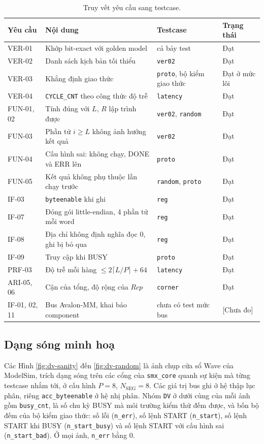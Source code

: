 \begin{table}[htbp]
\centering
\small
\begin{tabular}{lp{6.5cm}p{3.4cm}l}
\toprule
Yêu cầu & Nội dung & Testcase & Trạng thái \\
\midrule
VER-01 & Khớp bit-exact với golden model & cả bảy test & Đạt \\
VER-02 & Danh sách kịch bản tối thiểu & \texttt{ver02} & Đạt \\
VER-03 & Khẳng định giao thức & \texttt{proto}, bộ kiểm giao thức & Đạt ở mức lõi \\
VER-04 & \texttt{CYCLE\_CNT} theo công thức độ trễ & \texttt{latency} & Đạt \\
FUN-01, 02 & Tính đúng với $L$, $R$ lập trình được & \texttt{ver02}, \texttt{random} & Đạt \\
FUN-03 & Phần tử $i \ge L$ không ảnh hưởng kết quả & \texttt{ver02} & Đạt \\
FUN-04 & Cấu hình sai: không chạy, DONE và ERR lên & \texttt{proto} & Đạt \\
FUN-05 & Kết quả không phụ thuộc lần chạy trước & \texttt{random}, \texttt{proto} & Đạt \\
IF-03 & \texttt{byteenable} khi ghi & \texttt{reg} & Đạt \\
IF-07 & Đóng gói little-endian, 4 phần tử mỗi word & \texttt{reg} & Đạt \\
IF-08 & Địa chỉ không định nghĩa đọc 0, ghi bị bỏ qua & \texttt{reg} & Đạt \\
IF-09 & Truy cập khi BUSY & \texttt{proto} & Đạt \\
PRF-03 & Độ trễ mỗi hàng $\le 2\lceil L/P \rceil + 64$ & \texttt{latency} & Đạt \\
ARI-05, 06 & Cận của tổng, độ rộng của $\mathit{Rcp}$ & \texttt{corner} & Đạt \\
IF-01, 02, 11 & Bus Avalon-MM, khai báo component & chưa có test mức bus & [Chưa đo] \\
\bottomrule
\end{tabular}
\caption{Truy vết yêu cầu sang testcase.}
\label{tab:dv-trace}
\end{table}

\subsection{Dạng sóng minh hoạ}

Các Hình \ref{fig:dv-sanity} đến \ref{fig:dv-random} là ảnh chụp cửa sổ Wave của ModelSim, trích dạng sóng trên các cổng của \texttt{smx\_core} quanh sự kiện mà từng testcase nhắm tới, ở cấu hình $P = 8$, $N_{\text{SEG}} = 8$. Các giá trị bus ghi ở hệ thập lục phân, riêng \texttt{acc\_byteenable} ở hệ nhị phân. Nhóm \texttt{DV} ở dưới cùng của mỗi ảnh gồm \texttt{busy\_cnt}, là số chu kỳ BUSY mà môi trường kiểm thử đếm được, và bốn bộ đếm của bộ kiểm giao thức: số lỗi (\texttt{n\_err}), số lệnh START (\texttt{n\_start}), số lệnh START khi BUSY (\texttt{n\_start\_busy}) và số lệnh START với cấu hình sai (\texttt{n\_start\_bad}). Ở mọi ảnh, \texttt{n\_err} bằng 0.

